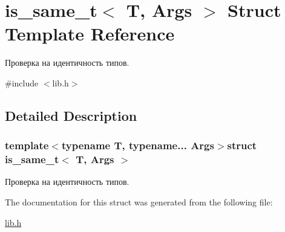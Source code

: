 \hypertarget{structis__same__t}{\section{is\-\_\-same\-\_\-t$<$ T, Args $>$ Struct Template Reference}
\label{structis__same__t}
}


Проверка на идентичность типов.  




{\ttfamily \#include $<$lib.\-h$>$}



\subsection{Detailed Description}
\subsubsection*{template$<$typename T, typename... Args$>$struct is\-\_\-same\-\_\-t$<$ T, Args $>$}

Проверка на идентичность типов. 

The documentation for this struct was generated from the following file\-:\begin{DoxyCompactItemize}
\item 
\hyperlink{lib_8h}{lib.\-h}\end{DoxyCompactItemize}
